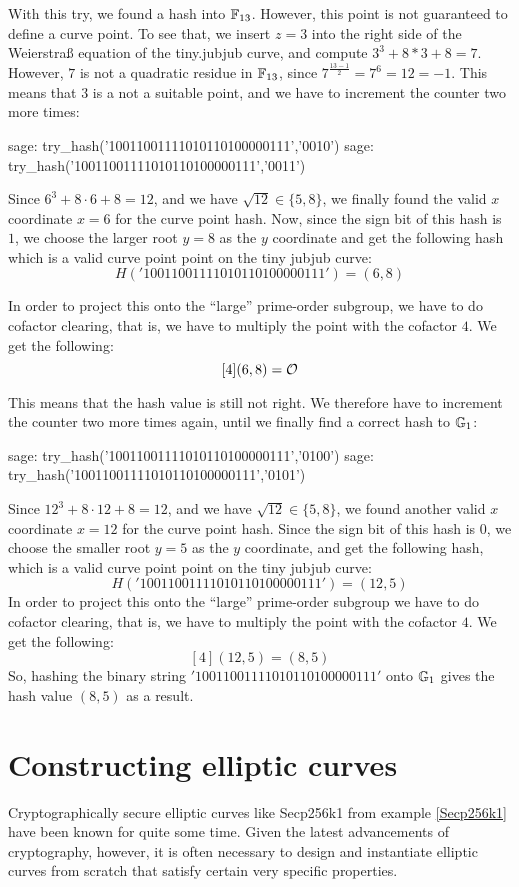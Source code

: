 \begin{example}
With this try, we found a hash into $\mathbb{F}_{13}$. However, this point is not guaranteed to define a curve point. To see that, we insert $z=3$ into the right side of the Weierstraß equation of the tiny.jubjub curve, and compute $3^3 + 8*3 + 8 = 7$. However, $7$ is not a quadratic residue in $\mathbb{F}_{13}$, since $7^{\frac{13-1}{2}}=7^6=12=-1$. This means that $3$ is a not a suitable point, and we have to increment the counter two more times: 
\begin{sagecommandline}
sage: try_hash('10011001111010110100000111','0010')
sage: try_hash('10011001111010110100000111','0011')
\end{sagecommandline}
Since $6^3 + 8\cdot 6 + 8 = 12$, and we have $\sqrt{12}\in\{5, 8\}$, we finally found the valid $x$ coordinate $x=6$ for the curve point hash. Now, since the sign bit of this hash is $1$, we choose the larger root $y=8$ as the $y$ coordinate and get the following hash which is a valid curve point point on the tiny jubjub curve:
$$
H('10011001111010110100000111') = (6,8)
$$

In order to project this onto the ``large'' prime-order subgroup, we have to do cofactor clearing, that is, we have to multiply the point with the cofactor $4$. We get the following:
$$
[4](6,8) = \mathcal{O}
$$ 

This means that the hash value is still not right. We therefore have to increment the counter two more times again, until we finally find a correct hash to $\mathbb{G}_1$:
\begin{sagecommandline}
sage: try_hash('10011001111010110100000111','0100')
sage: try_hash('10011001111010110100000111','0101')
\end{sagecommandline}

Since $12^3 + 8\cdot 12 + 8 = 12$, and we have $\sqrt{12}\in\{5, 8\}$, we found another valid $x$ coordinate $x=12$ for the curve point hash. Since the sign bit of this hash is $0$, we choose the smaller root $y=5$ as the $y$ coordinate, and get the following hash, which is a valid curve point point on the tiny jubjub curve:
$$
H('10011001111010110100000111') = (12,5)
$$
In order to project this onto the ``large'' prime-order subgroup we have to do cofactor clearing, that is, we have to multiply the point with the cofactor $4$. We get the following:
$$
[4](12,5) = (8,5)
$$
So, hashing the binary string $'10011001111010110100000111'$ onto $\mathbb{G}_1$ gives the hash value $(8,5)$ as a result. 
\end{example}

\section{Constructing elliptic curves} Cryptographically secure elliptic curves like Secp256k1 from example \ref{Secp256k1} have been known for quite some time. Given the latest advancements of cryptography, however, it is often necessary to design and instantiate elliptic curves from scratch that satisfy certain very specific properties. 


